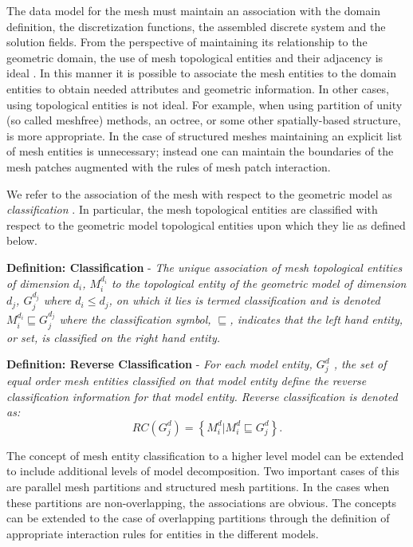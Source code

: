The data model for the mesh must maintain an association with the
domain definition, the discretization functions, the assembled
discrete system and the solution fields. From the perspective of
maintaining its relationship to the geometric domain, the use of
mesh topological entities and their adjacency is ideal
\cite{BeSh97,DeOB01,Ta00}. In this manner it is possible to associate
the mesh entities to the domain entities to obtain needed attributes
and geometric information.  In other cases, using topological entities
is not ideal.  For example, when using partition of unity (so
called meshfree) methods, an octree, or some other spatially-based
structure, is more appropriate. In the case of structured meshes
maintaining an explicit list of mesh entities is unnecessary; instead
one can maintain the boundaries of the mesh patches augmented with the
rules of mesh patch interaction.

We refer to the association of the mesh with respect to the geometric
model as {\it classification} \cite{BeSh97,ShGe92}. In particular, the
mesh topological entities are classified with respect to the geometric
model topological entities upon which they lie as defined below.

{\bf Definition: Classification} - {\it The unique association of mesh
topological entities of dimension $d_i$, $M^{d_i}_i$ to the
topological entity of the geometric model of dimension $d_j$,
$G^{d_j}_j$ where $d_i \leq d_j$, on which it lies is termed
classification and is denoted $M^{d_i}_i \sqsubseteq G^{d_j}_j$
where the classification symbol, $\sqsubseteq$,
indicates that the left hand entity, or set, is classified on the
right hand entity.}

{\bf Definition: Reverse Classification} - {\it For each model
entity, $G^d_j$ , the set of equal order mesh entities classified on that
model entity define the reverse classification information for that
model entity. Reverse classification is denoted as:}
\begin{equation}
RC(G^d_j) = \left\{ M^d_i | M^d_i \sqsubseteq G^d_j \right\}.
\end{equation}

The concept of mesh entity classification to a higher level model can
be extended to include additional levels of model decomposition. Two
important cases of this are parallel mesh partitions and structured
mesh partitions. In the cases when these partitions are
non-overlapping, the associations are obvious.  The concepts can be
extended to the case of overlapping partitions through the definition
of appropriate interaction rules for entities in the different models.

